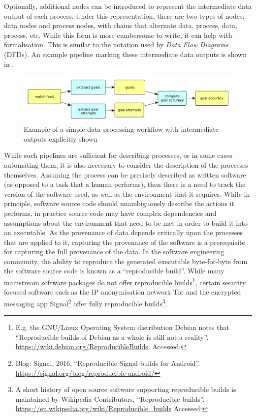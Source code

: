 Optionally, additional nodes can be introduced to represent the intermediate data output of each process. Under this representation, there are two types of nodes: data nodes and process nodes, with chains that alternate data, process, data, process, etc. While this form is more cumbersome to write, it can help with formalisation. This is similar to the notation used by \textit{Data Flow Diagrams} (DFDs). An example pipeline marking these intermediate data outputs is shown in .


\begin{figure}[h]
\centering
\includegraphics[width=\linewidth]{figs/dag/simple-dag.png}
\caption{Example of a simple data processing workflow with intermediate outputs explicitly shown}
\label{fig:simple-chain-intermediate}
\end{figure}


While such pipelines are sufficient for describing processes, or in some cases automating them, it is also necessary to consider the description of the processes themselves. Assuming the process can be precisely described as written software (as opposed to a task that a human performs), then there is a need to track the version of the software used, as well as the environment that it requires. While in principle, software source code should unambiguously describe the actions it performs, in practice source code may have complex dependencies and assumptions about the environment that need to be met in order to build it into an executable. As the provenance of data depends critically upon the processes that are applied to it, capturing the provenance of the software is a prerequisite for capturing the full provenance of the data. In the software engineering community, the ability to reproduce the generated executable byte-for-byte from the software source code is known as a ``reproducible build''. While many mainstream software packages do not offer reproducible builds\footnote{E.g. the GNU/Linux Operating System distribution Debian notes that ``Reproducible builds of Debian as a whole is still not a reality''. \url{https://wiki.debian.org/ReproducibleBuilds}. Accessed: }, certain security focused software such as the IP anonymisation network Tor and the encrypted messaging app Signal\footnote{Blog: Signal, 2016, ``Reproducible Signal builds for Android''. \url{https://signal.org/blog/reproducible-android/}} offer fully reproducible builds\footnote{A short history of open source software supporting reproducible builds is maintained by Wikipedia Contributors, ``Reproducible builds''. \url{https://en.wikipedia.org/wiki/Reproducible_builds} Accessed: }.

